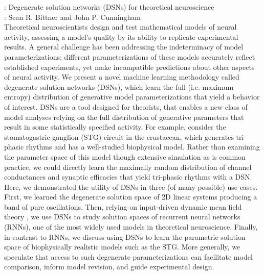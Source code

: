 \documentclass[12pt]{article}
\begin{document}
: Degenerate solution networks (DSNs) for theoretical neuroscience \\
: Sean R. Bittner and John P. Cunningham \\

\noindent Theoretical neuroscientists design and test mathematical models of neural activity, assessing a model's quality by its ability to replicate experimental results.  A general challenge has been addressing the indeterminacy of model parameterizations; different parameterizations of these models accurately reflect established experiments, yet make incompatible predictions about other aspects of neural activity.  We present a novel machine learning methodology called degenerate solution networks (DSNs), which learn the full (i.e. maximum entropy) distribution of generative model parameterizations that yield a behavior of interest.  DSNs are a tool designed for theorists, that enables a new class of model analyses relying on the full distribution of generative parameters that result in some statistically specified activity. For example, consider the stomatogastric ganglion (STG) circuit in the crustacean, which generates tri-phasic rhythms and has a well-studied biophysical model.  Rather than examining the parameter space of this model though extensive simulation \cite{prinz2004similar} as is common practice, we could directly learn the maximally random distribution of channel conductances and synaptic efficacies that yield tri-phasic rhythms with a DSN.  Here, we demonstrated the utility of DSNs in three (of many possible) use cases.  First, we learned the degenerate solution space of 2D linear systems producing a band of pure oscillations.  Then, relying on input-driven dynamic mean field theory \cite{mastrogiuseppe2018linking}, we use DSNs to study solution spaces of recurrent neural networks (RNNs), one of the most widely used models in theoretical neuroscience.  Finally, in contrast to RNNs, we discuss using DSNs to learn the parametric solution space of biophysically realistic models such as the STG.  More generally, we speculate that access to such degenerate parameterizations can facilitate model comparison, inform model revision, and guide experimental design.  \\
\end{document}
